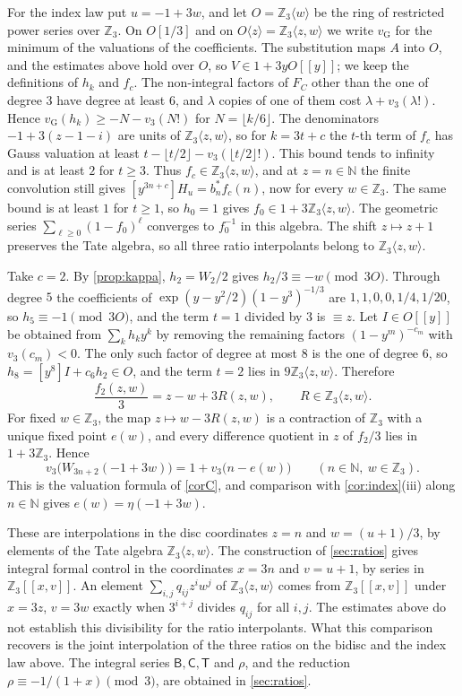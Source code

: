 \documentclass[11pt,reqno]{amsart}
\theoremstyle{definition}
\theoremstyle{remark}
\theoremstyle{plain}
\newcommand{\Z}{\mathbb Z}
\newcommand{\N}{\mathbb N}
\newcommand{\sB}{\mathsf B}
\newcommand{\sC}{\mathsf C}
\newcommand{\sT}{\mathsf T}
\newcommand{\vG}{v_{\mathrm G}}
\begin{document}
For the index law put $u=-1+3w$, and let $O=\Z_3\langle w\rangle$ be the ring of restricted power series over $\Z_3$. On $O[1/3]$ and on $O\langle z\rangle=\Z_3\langle z,w\rangle$ we write $\vG$ for the minimum of the valuations of the coefficients. The substitution maps $A$ into $O$, and the estimates above hold over $O$, so $V\in1+3yO[[y]]$; we keep the definitions of $h_k$ and $f_c$. The non-integral factors of $F_C$ other than the one of degree $3$ have degree at least $6$, and $\lambda$ copies of one of them cost $\lambda+v_3(\lambda!)$. Hence $\vG(h_k)\ge-N-v_3(N!)$ for $N=\lfloor k/6\rfloor$. The denominators $-1+3(z-1-i)$ are units of $\Z_3\langle z,w\rangle$, so for $k=3t+c$ the $t$-th term of $f_c$ has Gauss valuation at least $t-\lfloor t/2\rfloor-v_3(\lfloor t/2\rfloor!)$. This bound tends to infinity and is at least $2$ for $t\ge3$. Thus $f_c\in\Z_3\langle z,w\rangle$, and at $z=n\in\N$ the finite convolution still gives $[y^{3n+c}]H_u=b_n^*f_c(n)$, now for every $w\in\Z_3$.
The same bound is at least $1$ for $t\ge1$, so $h_0=1$ gives $f_0\in1+3\Z_3\langle z,w\rangle$. The geometric series $\sum_{\ell\ge0}(1-f_0)^\ell$ converges to $f_0^{-1}$ in this algebra. The shift $z\mapsto z+1$ preserves the Tate algebra, so all three ratio interpolants belong to $\Z_3\langle z,w\rangle$.

Take $c=2$. By \cref{prop:kappa}, $h_2=W_2/2$ gives $h_2/3\equiv-w\pmod{3O}$. Through degree $5$ the coefficients of $\exp(y-y^2/2)(1-y^3)^{-1/3}$ are $1,1,0,0,1/4,1/20$, so $h_5\equiv-1\pmod{3O}$, and the term $t=1$ divided by $3$ is $\equiv z$. Let $I\in O[[y]]$ be obtained from $\sum_kh_ky^k$ by removing the remaining factors $(1-y^m)^{-c_m}$ with $v_3(c_m)<0$. The only such factor of degree at most $8$ is the one of degree $6$, so $h_8=[y^8]I+c_6h_2\in O$, and the term $t=2$ lies in $9\Z_3\langle z,w\rangle$. Therefore
\[
 \frac{f_2(z,w)}3=z-w+3R(z,w),\qquad R\in\Z_3\langle z,w\rangle .
\]
For fixed $w\in\Z_3$, the map $z\mapsto w-3R(z,w)$ is a contraction of $\Z_3$ with a unique fixed point $e(w)$, and every difference quotient in $z$ of $f_2/3$ lies in $1+3\Z_3$. Hence
\[
 v_3\bigl(W_{3n+2}(-1+3w)\bigr)=1+v_3\bigl(n-e(w)\bigr)\qquad(n\in\N,\ w\in\Z_3).
\]
This is the valuation formula of \cref{corC}, and comparison with \cref{cor:index}(iii) along $n\in\N$ gives $e(w)=\eta(-1+3w)$.

These are interpolations in the disc coordinates $z=n$ and $w=(u+1)/3$, by elements of the Tate algebra $\Z_3\langle z,w\rangle$. The construction of \cref{sec:ratios} gives integral formal control in the coordinates $x=3n$ and $v=u+1$, by series in $\Z_3[[x,v]]$. An element $\sum_{i,j}q_{ij}z^iw^j$ of $\Z_3\langle z,w\rangle$ comes from $\Z_3[[x,v]]$ under $x=3z$, $v=3w$ exactly when $3^{i+j}$ divides $q_{ij}$ for all $i,j$. The estimates above do not establish this divisibility for the ratio interpolants. What this comparison recovers is the joint interpolation of the three ratios on the bidisc and the index law above. The integral series $\sB,\sC,\sT$ and $\rho$, and the reduction $\rho\equiv-1/(1+x)\pmod3$, are obtained in \cref{sec:ratios}.
\end{document}
